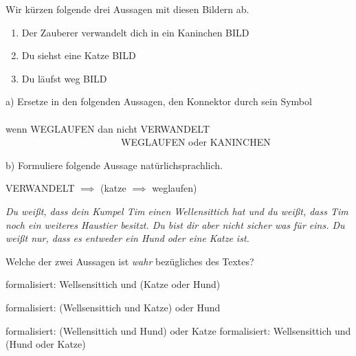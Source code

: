 \documentclass{uebungsblatt}
\begin{document}
\begin{exercise}

    Wir kürzen folgende drei Aussagen mit diesen Bildern ab.

    \begin{enumerate}
        \item Der Zauberer verwandelt dich in ein Kaninchen BILD
        \item Du siehst eine Katze BILD
        \item Du läufst weg BILD
    \end{enumerate}

    a) Ersetze in den folgenden Aussagen, den Konnektor durch sein Symbol
    \\ \\
        wenn WEGLAUFEN dan nicht VERWANDELT \ \ \ \ \ \ \ \ \ \ \ \  \ \ \
         \ \ \  \ \ \ \ \ \   WEGLAUFEN oder KANINCHEN  
    

    \begin{answerbox}[1in]
    \end{answerbox}


    b) Formuliere folgende Aussage natürlichsprachlich.

     VERWANDELT $\implies$ (katze $\implies$ weglaufen)

    \begin{answerbox}[1in]
    \end{answerbox}

\end{exercise}

\begin{exercise}

    \emph{Du weißt, dass dein Kumpel Tim einen Wellensittich hat und du weißt, dass 
    Tim noch ein weiteres Haustier besitzt. Du bist dir aber nicht sicher was für
    eins. Du weißt nur, dass es entweder ein Hund oder eine Katze ist.}

    Welche der zwei Aussagen ist \emph{wahr} bezügliches des Textes?

    \begin{multicols}{2}
        \begin{multiplechoice}
            \citem formalisiert: Wellsensittich und (Katze oder Hund)
            \item formalisiert: (Wellsensittich und Katze) oder Hund
            \item formalisiert: (Wellensittich und Hund) oder Katze
            \citem formalisiert: Wellsensittich und (Hund oder Katze)
        \end{multiplechoice}
    \end{multicols}

\end{exercise}

\end{document}
